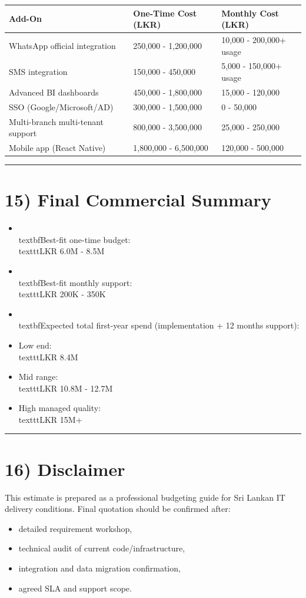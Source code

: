 \documentclass[11pt,a4paper]{article}
\begin{document}
\begin{longtable}{p{} | p{} | p{}}
\toprule
Add-On & One-Time Cost (LKR) & Monthly Cost (LKR) \\
\midrule
WhatsApp official integration & 250,000 - 1,200,000 & 10,000 - 200,000+ usage \\
SMS integration & 150,000 - 450,000 & 5,000 - 150,000+ usage \\
Advanced BI dashboards & 450,000 - 1,800,000 & 15,000 - 120,000 \\
SSO (Google/Microsoft/AD) & 300,000 - 1,500,000 & 0 - 50,000 \\
Multi-branch multi-tenant support & 800,000 - 3,500,000 & 25,000 - 250,000 \\
Mobile app (React Native) & 1,800,000 - 6,500,000 & 120,000 - 500,000 \\
\bottomrule
\end{longtable}

\bigskip\hrule\bigskip

\section{15) Final Commercial Summary}

\begin{itemize}
\item \\textbf{Best-fit one-time budget:} \\texttt{LKR 6.0M - 8.5M}
\item \\textbf{Best-fit monthly support:} \\texttt{LKR 200K - 350K}
\item \\textbf{Expected total first-year spend (implementation + 12 months support):}
\item Low end: \\texttt{LKR 8.4M}
\item Mid range: \\texttt{LKR 10.8M - 12.7M}
\item High managed quality: \\texttt{LKR 15M+}
\end{itemize}

\bigskip\hrule\bigskip

\section{16) Disclaimer}

This estimate is prepared as a professional budgeting guide for Sri Lankan IT delivery conditions. Final quotation should be confirmed after:\\

\begin{itemize}
\item detailed requirement workshop,
\item technical audit of current code/infrastructure,
\item integration and data migration confirmation,
\item agreed SLA and support scope.
\end{itemize}
\end{document}
